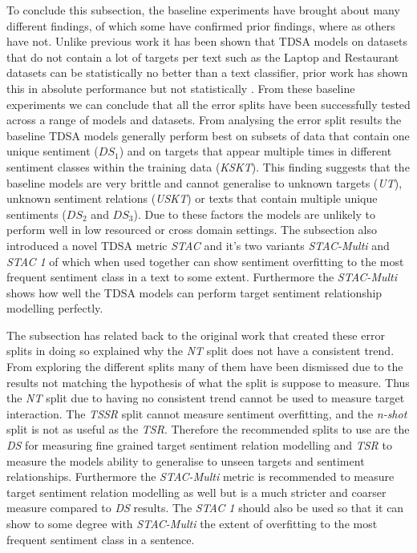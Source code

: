 To conclude this subsection, the baseline experiments have brought about many different findings, of which some have confirmed prior findings, where as others have not. Unlike previous work it has been shown that TDSA models on datasets that do not contain a lot of targets per text such as the Laptop and Restaurant datasets can be statistically no better than a text classifier, prior work has shown this in absolute performance but not statistically \citep{jiang-etal-2019-challenge}. From these baseline experiments we can conclude that all the error splits have been successfully tested across a range of models and datasets. From analysing the error split results the baseline TDSA models generally perform best on subsets of data that contain one unique sentiment ($DS_1$) and on targets that appear multiple times in different sentiment classes within the training data (\textit{KSKT}). This finding suggests that the baseline models are very brittle and cannot generalise to unknown targets (\textit{UT}), unknown sentiment relations (\textit{USKT}) or texts that contain multiple unique sentiments ($DS_2$ and $DS_3$). Due to these factors the models are unlikely to perform well in low resourced or cross domain settings. The subsection also introduced a novel TDSA metric \textit{STAC} and it's two variants \textit{STAC-Multi} and \textit{STAC 1} of which when used together can show sentiment overfitting to the most frequent sentiment class in a text to some extent. Furthermore the \textit{STAC-Multi} shows how well the TDSA models can perform target sentiment relationship modelling perfectly. 

The subsection has related back to the original work that created these error splits in doing so explained why the \textit{NT} split does not have a consistent trend. From exploring the different splits many of them have been dismissed due to the results not matching the hypothesis of what the split is suppose to measure. Thus the \textit{NT} split due to having no consistent trend cannot be used to measure target interaction. The \textit{TSSR} split cannot measure sentiment overfitting, and the \textit{n-shot} split is not as useful as the \textit{TSR}. Therefore the recommended splits to use are the \textit{DS} for measuring fine grained target sentiment relation modelling and \textit{TSR} to measure the models ability to generalise to unseen targets and sentiment relationships. Furthermore the \textit{STAC-Multi} metric is recommended to measure target sentiment relation modelling as well but is a much stricter and coarser measure compared to \textit{DS} results. The \textit{STAC 1} should also be used so that it can show to some degree with \textit{STAC-Multi} the extent of overfitting to the most frequent sentiment class in a sentence.

